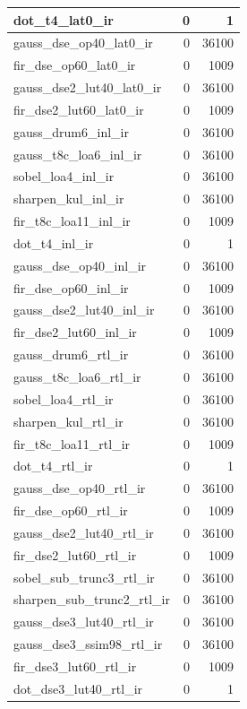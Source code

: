 \begin{table}[htbp]
\begin{tabular}{|l|r|r|}
dot\_t4\_lat0\_ir & 0 & 1 \\ \hline
gauss\_dse\_op40\_lat0\_ir & 0 & 36100 \\ \hline
fir\_dse\_op60\_lat0\_ir & 0 & 1009 \\ \hline
gauss\_dse2\_lut40\_lat0\_ir & 0 & 36100 \\ \hline
fir\_dse2\_lut60\_lat0\_ir & 0 & 1009 \\ \hline
gauss\_drum6\_inl\_ir & 0 & 36100 \\ \hline
gauss\_t8c\_loa6\_inl\_ir & 0 & 36100 \\ \hline
sobel\_loa4\_inl\_ir & 0 & 36100 \\ \hline
sharpen\_kul\_inl\_ir & 0 & 36100 \\ \hline
fir\_t8c\_loa11\_inl\_ir & 0 & 1009 \\ \hline
dot\_t4\_inl\_ir & 0 & 1 \\ \hline
gauss\_dse\_op40\_inl\_ir & 0 & 36100 \\ \hline
fir\_dse\_op60\_inl\_ir & 0 & 1009 \\ \hline
gauss\_dse2\_lut40\_inl\_ir & 0 & 36100 \\ \hline
fir\_dse2\_lut60\_inl\_ir & 0 & 1009 \\ \hline
gauss\_drum6\_rtl\_ir & 0 & 36100 \\ \hline
gauss\_t8c\_loa6\_rtl\_ir & 0 & 36100 \\ \hline
sobel\_loa4\_rtl\_ir & 0 & 36100 \\ \hline
sharpen\_kul\_rtl\_ir & 0 & 36100 \\ \hline
fir\_t8c\_loa11\_rtl\_ir & 0 & 1009 \\ \hline
dot\_t4\_rtl\_ir & 0 & 1 \\ \hline
gauss\_dse\_op40\_rtl\_ir & 0 & 36100 \\ \hline
fir\_dse\_op60\_rtl\_ir & 0 & 1009 \\ \hline
gauss\_dse2\_lut40\_rtl\_ir & 0 & 36100 \\ \hline
fir\_dse2\_lut60\_rtl\_ir & 0 & 1009 \\ \hline
sobel\_sub\_trunc3\_rtl\_ir & 0 & 36100 \\ \hline
sharpen\_sub\_trunc2\_rtl\_ir & 0 & 36100 \\ \hline
gauss\_dse3\_lut40\_rtl\_ir & 0 & 36100 \\ \hline
gauss\_dse3\_ssim98\_rtl\_ir & 0 & 36100 \\ \hline
fir\_dse3\_lut60\_rtl\_ir & 0 & 1009 \\ \hline
dot\_dse3\_lut40\_rtl\_ir & 0 & 1 \\ \hline
\end{tabular}
\end{table}

